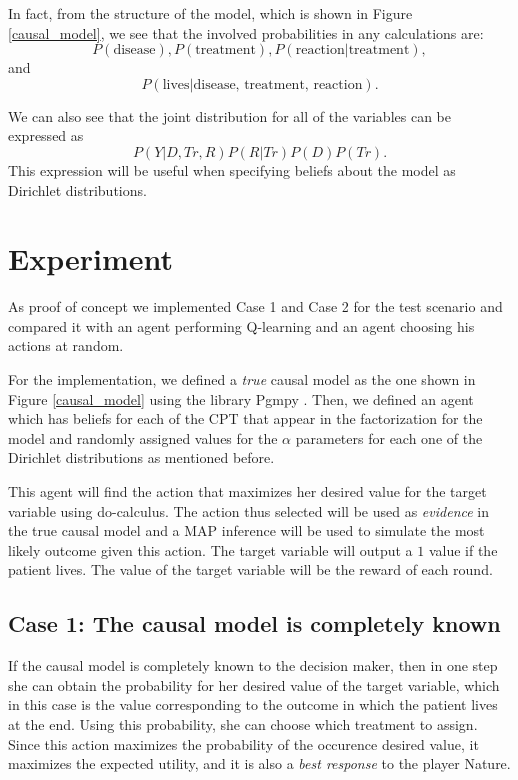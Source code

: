 \documentclass{article}
\begin{document}
In fact, from the structure of the model, which is shown in Figure \ref{causal_model}, we see that the involved probabilities in any calculations are:
\[ P(\textrm{disease}), P(\textrm{treatment}), P(\textrm{reaction} | \textrm{treatment}), \]
and
\[P(\textrm{lives} | \textrm{disease, treatment, reaction}). \]

We can also see that the joint distribution for all of the variables can be expressed as
\[ P(Y | D, Tr, R)P(R | Tr) P(D)P(Tr). \]
This expression will be useful when specifying beliefs about the model as Dirichlet distributions.
\section{Experiment}
As proof of concept we implemented  Case 1 and Case 2 for the test scenario and compared it with an agent performing Q-learning and an agent choosing his actions at random. 

For the implementation, we defined a \textit{true} causal model as the one shown in Figure \ref{causal_model} using the library Pgmpy \cite{ankan2015pgmpy}. Then, we defined an agent which has beliefs for each of the CPT that appear in the factorization for the model and randomly assigned values for the $\alpha$ parameters for each one of the Dirichlet distributions as mentioned before. 

This agent will find the action that maximizes her desired value for the target variable using do-calculus. The action thus selected will be used as \textit{evidence} in the true causal model and a MAP inference will be used to simulate the most likely outcome given this action. The target variable will output a $1$ value if the patient lives. The value of the target variable will be the reward of each round.

\subsection{Case 1: The causal model is completely known}
If the causal model is completely known to the decision maker, then in one step she can obtain the probability for her desired value of the target variable, which in this case is the value corresponding to the outcome in which the patient lives at the end. Using this probability, she can choose which treatment to assign. Since this action maximizes the probability of the occurence desired value, it maximizes the expected utility, and it is also a \textit{best response} to the player Nature.
\end{document}
